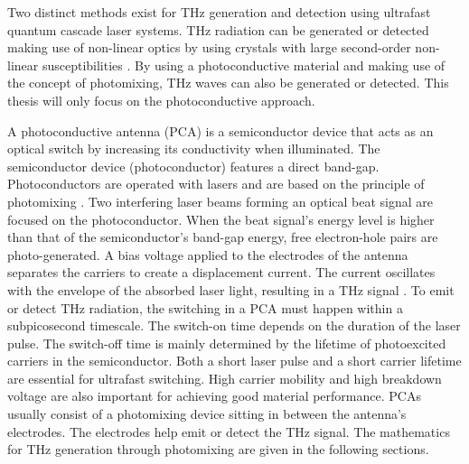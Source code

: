 Two distinct methods exist for THz generation and detection using ultrafast quantum cascade laser systems. THz radiation can be generated or detected making use of non-linear optics by using crystals with large second-order non-linear susceptibilities \cite{THzSourcesDetectors, kimHighlyNonlinearOptical2021}. By using a photoconductive material and making use of the concept of photomixing, THz waves can also be generated or detected. This thesis will only focus on the photoconductive approach. 


A photoconductive antenna (PCA) is a semiconductor device that acts as an optical switch by increasing its conductivity when illuminated. The semiconductor device (photoconductor) features a direct band-gap. Photoconductors are operated with lasers and are based on the principle of photomixing \cite{peytavitTHzPhotomixers2021}. Two interfering laser beams forming an optical beat signal are focused on the photoconductor. When the beat signal's energy level is higher than that of the semiconductor's band-gap energy, free electron-hole pairs are photo-generated. A bias voltage applied to the electrodes of the antenna separates the carriers to create a displacement current. The current oscillates with the envelope of the absorbed laser light, resulting in a THz signal \cite{nandiErAsInAlGaAsPhotoconductors2021}. To emit or detect THz radiation, the switching in a PCA must happen within a subpicosecond timescale. The switch-on time depends on the duration of the laser pulse. The switch-off time is mainly determined by the lifetime of photoexcited carriers in the semiconductor. Both a short laser pulse and a short carrier lifetime are essential for ultrafast switching. High carrier mobility and high breakdown voltage are also important for achieving good material performance. PCAs usually consist of a photomixing device sitting in between the antenna's electrodes. The electrodes help emit or detect the THz signal. The mathematics for THz generation through photomixing are given in the following sections. 





